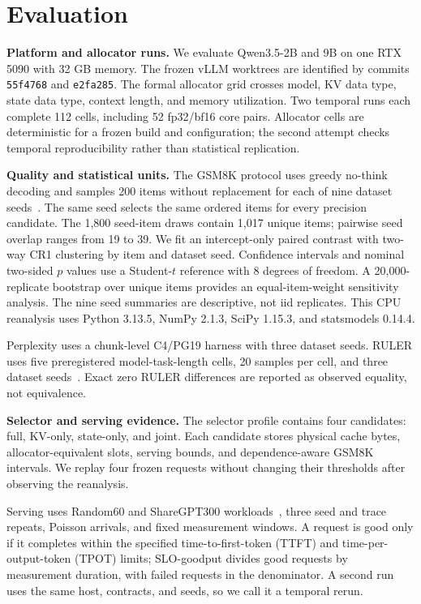 \documentclass[conference,letterpaper,10pt]{IEEEtran}
\begin{document}
\section{Evaluation}
\label{sec:setup}

\textbf{Platform and allocator runs.}
We evaluate Qwen3.5-2B and 9B on one RTX 5090 with 32 GB memory. The frozen
vLLM worktrees are identified by commits \texttt{55f4768} and
\texttt{e2fa285}. The formal allocator grid crosses model, KV data type,
state data type, context length, and memory utilization. Two temporal runs
each complete 112 cells, including 52 fp32/bf16 core pairs. Allocator cells
are deterministic for a frozen build and configuration; the second attempt
checks temporal reproducibility rather than statistical replication.

\textbf{Quality and statistical units.}
The GSM8K protocol uses greedy no-think decoding and samples 200 items without
replacement for each of nine dataset seeds~\cite{gsm8k}. The same seed selects
the same ordered items for every precision candidate. The 1,800 seed-item
draws contain 1,017 unique items; pairwise seed overlap ranges from 19 to 39.
We fit an intercept-only paired contrast with two-way CR1 clustering by item
and dataset seed. Confidence intervals and nominal two-sided $p$ values use a
Student-$t$ reference with 8 degrees of freedom. A 20,000-replicate bootstrap
over unique items provides an equal-item-weight sensitivity analysis. The
nine seed summaries are descriptive, not iid replicates. This CPU reanalysis
uses Python 3.13.5, NumPy 2.1.3, SciPy 1.15.3, and statsmodels 0.14.4.

Perplexity uses a chunk-level C4/PG19 harness with three dataset seeds. RULER
uses five preregistered model-task-length cells, 20 samples per cell, and three
dataset seeds~\cite{ruler}. Exact zero RULER differences are reported as
observed equality, not equivalence.

\textbf{Selector and serving evidence.}
The selector profile contains four candidates: full, KV-only, state-only, and
joint. Each candidate stores physical cache bytes, allocator-equivalent slots,
serving bounds, and dependence-aware GSM8K intervals. We replay four frozen
requests without changing their thresholds after observing the reanalysis.

Serving uses Random60 and ShareGPT300 workloads~\cite{sharegpt}, three seed and
trace repeats, Poisson arrivals, and fixed measurement windows. A request is
good only if it completes within the specified time-to-first-token (TTFT) and
time-per-output-token (TPOT) limits; SLO-goodput divides good requests by
measurement duration, with failed requests in the denominator. A second run
uses the same host, contracts, and seeds, so we call it a temporal rerun.
\end{document}
